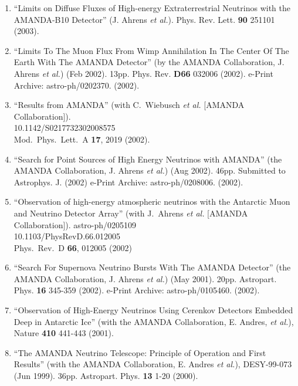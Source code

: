 \begin{enumerate}
\item ``Limits on Diffuse Fluxes of High-energy
        Extraterrestrial   Neutrinos with the AMANDA-B10
        Detector'' (J. Ahrens {\it et al.}).   Phys. Rev.
        Lett. {\bf 90} 251101 (2003).

\item ``Limits To The Muon Flux From Wimp Annihilation In
        The Center Of   The Earth With The AMANDA Detector''
        (by the AMANDA Collaboration,   J. Ahrens {\it et
        al.}) (Feb 2002). 13pp. Phys. Rev. {\bf D66} 032006
        (2002). e-Print Archive: astro-ph/0202370.  (2002).

\item ``Results from AMANDA'' (with C.~Wiebusch {\it et al.}
        [AMANDA   Collaboration]).
        \\{}10.1142/S0217732302008575   \\{}Mod.\ Phys.\
        Lett.\ A {\bf 17}, 2019 (2002).

\item ``Search for Point Sources of High Energy Neutrinos
        with AMANDA''   (the AMANDA Collaboration, J. Ahrens
        {\it et al.}) (Aug   2002). 46pp. Submitted to
        Astrophys. J. (2002) e-Print Archive:
        astro-ph/0208006.  (2002).

\item ``Observation of high-energy atmospheric neutrinos
        with the Antarctic Muon and Neutrino Detector
        Array'' (with J.~Ahrens {\it et al.}  [AMANDA
        Collaboration]). astro-ph/0205109
        \\{}10.1103/PhysRevD.66.012005 \\{}Phys.\ Rev.\ D
        {\bf 66}, 012005 (2002) %

\item ``Search For Supernova Neutrino Bursts With The AMANDA
        Detector''   (the AMANDA Collaboration, J. Ahrens
        {\it et al.}) (May 2001). 20pp.   Astropart. Phys.
        {\bf 16} 345-359 (2002).  e-Print Archive:
        astro-ph/0105460.  (2002).

\item ``Observation of High-Energy Neutrinos Using Cerenkov
        Detectors   Embedded Deep in Antarctic Ice'' (with
        the AMANDA Collaboration,   E. Andres, {\it et
        al.}), Nature {\bf 410} 441-443 (2001).

\item ``The AMANDA Neutrino Telescope: Principle of
        Operation and First   Results'' (with the AMANDA
        Collaboration, E. Andres {\it et al.}), DESY-99-073
        (Jun 1999). 36pp. Astropart. Phys. {\bf 13} 1-20
        (2000).


\end{enumerate}
